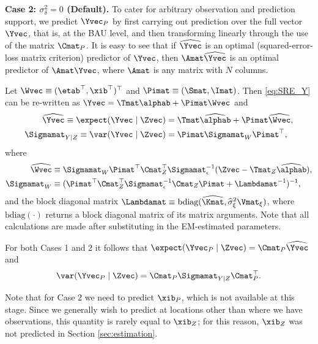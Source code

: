 {\bf Case 2: $\sigma^2_\delta = 0$ (Default).} To cater for arbitrary observation and prediction support, we predict $\Yvec_P$ by first carrying out prediction over the full vector $\Yvec$, that is, at the BAU level, and then transforming linearly through the use of the matrix $\Cmat_P$. It is easy to see that if $\widehat\Yvec$ is an optimal (squared-error-loss matrix criterion) predictor of $\Yvec$, then $\Amat\widehat\Yvec$ is an optimal predictor of $\Amat\Yvec$, where $\Amat$ is any matrix with $N$ columns.

Let $\Wvec \equiv (\etab^\top,\xib^\top)^\top$ and $\Pimat \equiv (\Smat,\Imat)$. Then \eqref{eq:SRE_Y} can be re-written as $\Yvec = \Tmat\alphab + \Pimat\Wvec$ and
\begin{align}
\widehat\Yvec \equiv \expect(\Yvec \mid \Zvec) &= \Tmat\widehat\alphab + \Pimat\widehat\Wvec, \nonumber \\
\Sigmamat_{Y \mid Z} \equiv \var(\Yvec \mid \Zvec) &= \Pimat \Sigmamat_W\Pimat^\top, \label{eq:Sigma_YZ}
\end{align}
where
\begin{align*}
\widehat\Wvec &\equiv \Sigmamat_W\Pimat^\top\Cmat_Z^\top\Sigmamat_\epsilon^{-1}(\Zvec - \Tmat_Z\widehat\alphab),\\%
\Sigmamat_W &\equiv (\Pimat^\top \Cmat_Z^\top \Sigmamat_\epsilon^{-1} \Cmat_Z \Pimat + \Lambdamat^{-1})^{-1},\\%
\end{align*}
and the block diagonal matrix $\Lambdamat \equiv \textrm{bdiag}(\widehat\Kmat,\widehat\sigma^{2}_\xi\Vmat_{\xi})$, where $\textrm{bdiag}(\cdot)$ returns a block diagonal matrix of its matrix arguments. Note that all calculations are made after substituting in the EM-estimated parameters.

For both Cases 1 and 2 it follows that $\expect(\Yvec_P \mid \Zvec) = \Cmat_P\widehat\Yvec$ and
\begin{equation*}%
\var(\Yvec_P \mid \Zvec) = \Cmat_P \Sigmamat_{Y \mid Z} \Cmat_P^\top.
\end{equation*}

Note that for Case 2 we need to predict $\xib_P$, which is not available at this stage. Since we generally wish to predict at locations other than where we have observations, this quantity is rarely equal to $\xib_Z$; for this reason, $\xib_Z$ was not predicted in Section \ref{sec:estimation}.

